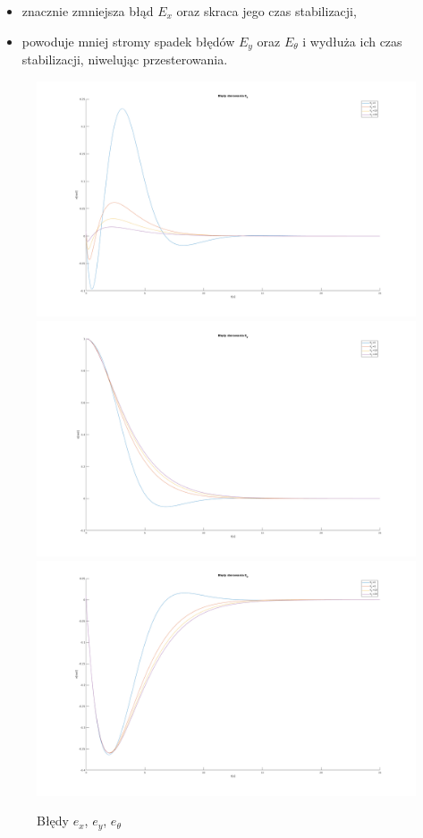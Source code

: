 \documentclass[12pt,a4paper]{article}
\begin{document}
  \begin{itemize}
    \item znacznie zmniejsza błąd $E_x$ oraz skraca jego czas stabilizacji,
    \item powoduje mniej stromy spadek błędów $E_y$ oraz $E_\theta$ i wydłuża ich czas stabilizacji, niwelując przesterowania.
  \end{itemize}
  
  \begin{figure}[H]
    \centering
    \includegraphics[height=0.33\textheight]{figures/dyn_bledy_k1_ex.png}
    \includegraphics[height=0.33\textheight]{figures/dyn_bledy_k1_ey.png}
    \includegraphics[height=0.33\textheight]{figures/dyn_bledy_k1_eo.png}
    \caption{Błędy $e_x$, $e_y$, $e_\theta$}
    \label{fig:5}
  \end{figure}
\end{document}
